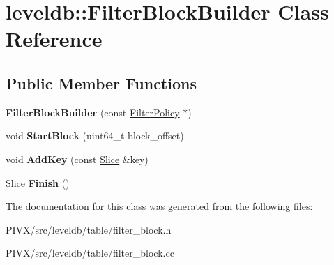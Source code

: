 \hypertarget{classleveldb_1_1_filter_block_builder}{}\section{leveldb\+:\+:Filter\+Block\+Builder Class Reference}
\label{classleveldb_1_1_filter_block_builder}
\subsection*{Public Member Functions}
\begin{DoxyCompactItemize}
\item 
\mbox{\label{classleveldb_1_1_filter_block_builder_a8e8b5ae95df5a13c035bec85e22549ca}} 
{\bfseries Filter\+Block\+Builder} (const \mbox{\hyperlink{classleveldb_1_1_filter_policy}{Filter\+Policy}} $\ast$)
\item 
\mbox{\label{classleveldb_1_1_filter_block_builder_a766a753a200f7386196a68897e47c1c3}} 
void {\bfseries Start\+Block} (uint64\+\_\+t block\+\_\+offset)
\item 
\mbox{\label{classleveldb_1_1_filter_block_builder_a4fd9db735c5c72973cec62e4fd98137d}} 
void {\bfseries Add\+Key} (const \mbox{\hyperlink{classleveldb_1_1_slice}{Slice}} \&key)
\item 
\mbox{\label{classleveldb_1_1_filter_block_builder_a75fa127d8af42e749abdd235eed97cad}} 
\mbox{\hyperlink{classleveldb_1_1_slice}{Slice}} {\bfseries Finish} ()
\end{DoxyCompactItemize}


The documentation for this class was generated from the following files\+:\begin{DoxyCompactItemize}
\item 
P\+I\+V\+X/src/leveldb/table/filter\+\_\+block.\+h\item 
P\+I\+V\+X/src/leveldb/table/filter\+\_\+block.\+cc\end{DoxyCompactItemize}
